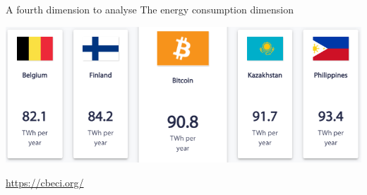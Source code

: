 \documentclass{beamer}
\begin{document}
\begin{frame}{A fourth dimension to analyse}
The energy consumption dimension
\begin{center}
     \includegraphics[width=\textwidth]{../../Figures/BTC_energy_consumption.png}
     \end{center}

\url{https://cbeci.org/}

\end{frame}


% 
% 
\end{document}
